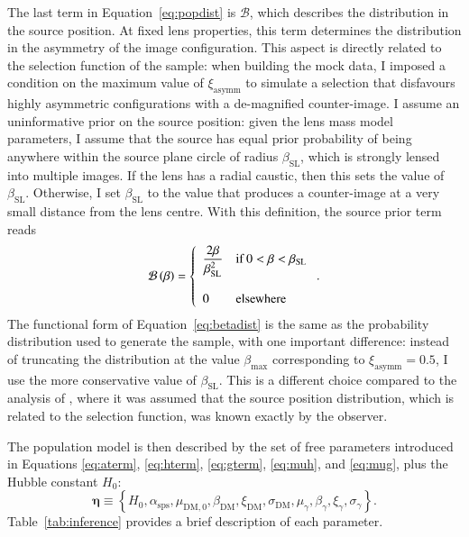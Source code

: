 \documentclass{aa}
\def\asymm{\xi_{\mathrm{asymm}}}
\def\asps{\alpha_{\mathrm{sps}}}
\def\betamax{\beta_{\mathrm{max}}}
\def\betasl{\beta_{\mathrm{SL}}}
\def\hyperpars{\boldsymbol{\eta}}
\def\Tref#1{Table~\ref{#1}\xspace}
\def\Eref#1{Equation~\ref{#1}\xspace}
\begin{document}
The last term in \Eref{eq:popdist} is $\mathcal{B}$, which describes the distribution in the source position.
At fixed lens properties, this term determines the distribution in the asymmetry of the image configuration. This aspect is directly related to the selection function of the sample: when building the mock data, I imposed a condition on the maximum value of $\asymm$ to simulate a selection that disfavours highly asymmetric configurations with a de-magnified counter-image.
I assume an uninformative prior on the source position: given the lens mass model parameters, I assume that the source has equal prior probability of being anywhere within the source plane circle of radius $\betasl$, which is strongly lensed into multiple images. 
If the lens has a radial caustic, then this sets the value of $\betasl$. Otherwise, I set $\betasl$ to the value that produces a counter-image at a very small distance from the lens centre.
With this definition, the source prior term reads
\begin{equation}\label{eq:betadist}
\mathcal{B}\left(\beta\right) = \left\{\begin{array}{ll} \dfrac{2\beta}{\betasl^2} & \rm{if}\,0 < \beta < \betasl\\
& \\
0 & \rm{elsewhere}\end{array}\right. .
\end{equation}
The functional form of \Eref{eq:betadist} is the same as the probability distribution used to generate the sample, with one important difference: instead of truncating the distribution at the value $\betamax$ corresponding to $\asymm=0.5$, I use the more conservative value of $\betasl$.
This is a different choice compared to the analysis of , where it was assumed that the source position distribution, which is related to the selection function, was known exactly by the observer.

The population model is then described by the set of free parameters introduced in Equations \ref{eq:aterm}, \ref{eq:hterm}, \ref{eq:gterm}, \ref{eq:muh}, and \ref{eq:mug}, plus the Hubble constant $H_0$:
\begin{equation}\label{eq:hyperpars}
\hyperpars \equiv \left\{H_0,\asps,\mu_{\mathrm{DM},0},\beta_{\mathrm{DM}},\xi_{\mathrm{DM}},\sigma_{\mathrm{DM}},\mu_\gamma,\beta_\gamma,\xi_\gamma,\sigma_\gamma\right\}.
\end{equation}
\Tref{tab:inference} provides a brief description of each parameter.
\end{document}
